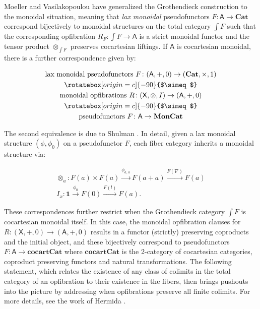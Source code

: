 \documentclass[oneside,final]{ucr}
\theoremstyle{definition}
\newcommand{\A}{\mathsf{A}}
\newcommand\vertsimeq{\mathrel{\rotatebox[origin=c]{-90}{$\simeq$}}}
\newcommand{\X}{\mathsf{X}}
\begin{document}
{Moeller and Vasilakopoulou \cite{MV} have generalized the Grothendieck construction to the monoidal situation, meaning that \emph{lax monoidal} pseudofunctors $F \colon \mathsf{A} \to \mathbf{Cat}$ correspond bijectively to monoidal structures on the total category $\int F$ such that the corresponding opfibration $R_F \colon \int F \to \mathsf{A}$ is a strict monoidal functor and the tensor product $\otimes_{\int F}$ preserves cocartesian liftings. If $\mathsf{A}$ is cocartesian monoidal, there is a further correspondence given by:

\begin{gather}
\textrm{lax monoidal pseudofunctors }F\colon(\A,+,0)\to(\mathbf{Cat},\times,1) \notag\\
\vertsimeq \notag\\
\textrm{monoidal opfibrations }R\colon(\X,\otimes,I)\to(\A,+,0) \label{monGroth}\\
\vertsimeq \notag\\
\textrm{pseudofunctors }F\colon\A\to\mathbf{MonCat} \notag
\end{gather}

The second equivalence is due to Shulman \cite{Shul2}. In detail, given a lax monoidal structure $(\phi, \phi_0)$ on a pseudofunctor $F$, each fiber category inherits a monoidal structure via: 

\begin{gather}\label{eq:explicitstructure1}
\otimes_a\colon F(a)\times F(a)\xrightarrow{\phi_{a,a}}F(a+a)\xrightarrow{F(\nabla)}F(a)\\
I_x\colon\mathbf{1}\xrightarrow{\phi_0}F(0)\xrightarrow{F(!)}F(a).\nonumber
\end{gather}

These correspondences further restrict when the Grothendieck category $\int F$ is cocartesian monoidal itself. In this case, the monoidal opfibration clauses for $R \colon (\mathsf{X},+,0) \to (\mathsf{A},+,0)$ results in a functor (strictly) preserving coproducts and the initial object, and these bijectively correspond to pseudofunctors $F \colon \mathsf{A} \to \mathbf{cocartCat}$ where $\mathbf{cocartCat}$ is the 2-category of cocartesian categories, coproduct preserving functors and natural transformations. The following statement, which relates the existence of any class of colimits in the total category of an opfibration to their existence in the fibers, then brings pushouts into the picture by addressing when opfibrations preserve all finite colimits.  For more details, see the work of Hermida \cite{Herm}.

}
\end{document}
